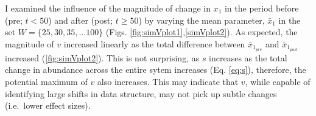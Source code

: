 \documentclass[12pt,twoside,openany]{reedthesis}
\newenvironment{Shaded}{\begin{snugshade}}{\end{snugshade}}
\newcommand{\KeywordTok}[1]{\textcolor[rgb]{0.13,0.29,0.53}{\textbf{#1}}}
\newcommand{\DataTypeTok}[1]{\textcolor[rgb]{0.13,0.29,0.53}{#1}}
\newcommand{\DecValTok}[1]{\textcolor[rgb]{0.00,0.00,0.81}{#1}}
\newcommand{\StringTok}[1]{\textcolor[rgb]{0.31,0.60,0.02}{#1}}
\newcommand{\OperatorTok}[1]{\textcolor[rgb]{0.81,0.36,0.00}{\textbf{#1}}}
\newcommand{\NormalTok}[1]{#1}
\begin{document}
I examined the influence of the magnitude of change in \(x_1\) in the
period before (pre; \(t <50\)) and after (post; \(t \geq 50\)) by
varying the mean parameter, \(\bar{x}_1\) in the set
\(W=\{25,30,35,...100 \}\) (Figs. \ref{fig:simVplot1},\ref{simVplot2}).
As expected, the magnitude of \(v\) increased linearly as the total
difference between \(\bar{x}_{1_{pre}}\) and \(\bar{x}_{1_{post}}\)
increased (\ref{fig:simVplot2}). This is not surprising, as \(s\)
increases as the total change in abundance across the entire sytem
increases (Eq. \eqref{eq:s}), therefore, the potential maximum of \(v\)
also increases. This may indicate that \(v\), while capable of
identifying large shifts in data structure, may not pick up subtle
changes (i.e.~lower effect sizes).
\begin{Shaded}
\end{Shaded}
\end{document}
